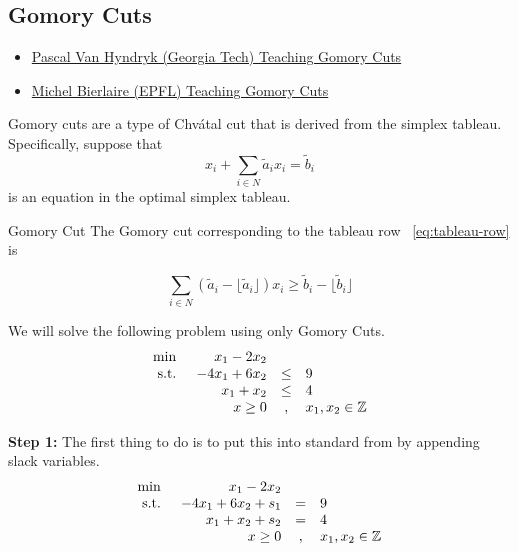 \subsection{Gomory Cuts}
\begin{resource}
\begin{itemize}
\item \href{https://www.youtube.com/watch?v=1i0rKtH_YPs&list=PLNMgVqt8MREx6Nex1Q9003vrZem-JXNvX&index=28&ab_channel=EducationalDocumentaries}{Pascal Van Hyndryk (Georgia Tech) Teaching Gomory Cuts}
\item \href{https://www.youtube.com/watch?v=VdXHGNDnjjo}{Michel Bierlaire (EPFL) Teaching Gomory Cuts}
\end{itemize}
\end{resource}
Gomory cuts are a type of Chv\'atal cut that is derived from the simplex tableau.  Specifically, suppose that 
\begin{equation}
\label{eq:tableau-row}
 x_i + \sum_{i\in N} \tilde a_i x_i = \tilde b_i
\end{equation}
is an equation in the optimal simplex tableau. 

\begin{general}{Gomory Cut}{}
The Gomory cut corresponding to the tableau row ~\eqref{eq:tableau-row} is

\begin{equation}
\label{eq:gomory-cut}
\sum_{i\in N} (\tilde a_i - \lfloor \tilde a_i \rfloor) x_i \geq \tilde b_i - \lfloor \tilde b_i\rfloor
\end{equation}


\end{general}


We will solve the following problem using only Gomory Cuts.
\begin{equation*}
\begin{array}{lrcl}
\min & x_1 - 2x_2\\
\mbox{ s.t. } & -4x_1 + 6x_2  & \leq & 9\\
& x_1 + x_2   & \leq & 4\\
& x \geq 0 & , & x_1,x_2 \in {\mathbb{Z}}
\end{array}
\end{equation*}

\textbf{Step 1:} The first thing to do is to put this into standard from by appending slack variables.
\begin{equation}
\label{eq:gomory-standard-form}
\begin{array}{lrcl}
\min & x_1 - 2x_2\\
\mbox{ s.t. } & -4x_1 + 6x_2 + s_1 & = & 9\\
& x_1 + x_2 + s_2  & = & 4\\
& x \geq 0 & , & x_1,x_2 \in {\mathbb{Z}}
\end{array}
\end{equation}

